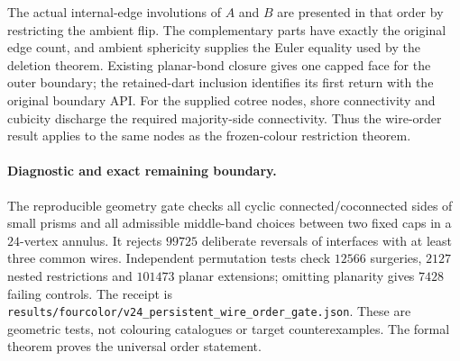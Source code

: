 The actual internal-edge involutions of $A$ and $B$ are presented in
that order by restricting the ambient flip.  The complementary parts have
exactly the original edge count, and ambient sphericity supplies the Euler
equality used by the deletion theorem.
Existing planar-bond closure gives one capped face for the outer boundary;
the retained-dart inclusion identifies its first return with the original
boundary API.
For the supplied cotree nodes, shore connectivity and cubicity discharge
the required majority-side connectivity.  Thus the wire-order result
applies to the same nodes as the frozen-colour restriction theorem.

\paragraph{Diagnostic and exact remaining boundary.}
The reproducible geometry gate checks all cyclic connected/coconnected
sides of small prisms and all admissible middle-band choices between two
fixed caps in a $24$-vertex annulus.  It rejects $99725$ deliberate
reversals of interfaces with at least three common wires.  Independent
permutation tests check $12566$ surgeries, $2127$ nested restrictions and
$101473$ planar extensions; omitting planarity gives $7428$ failing
controls.  The receipt is
\texttt{results/fourcolor/v24\_persistent\_wire\_order\_gate.json}.
These are geometric tests, not colouring catalogues or target
counterexamples.  The formal theorem proves the universal order statement.

